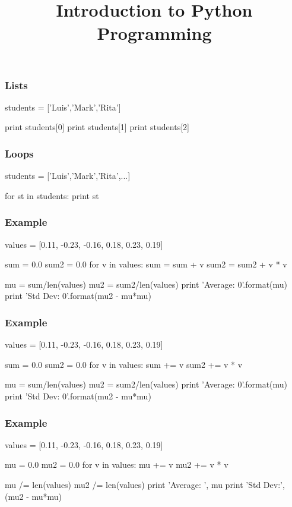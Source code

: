 
\title[Python I]{Introduction to Python Programming}


\frame{\maketitle}

\begin{frame}[fragile]
\frametitle{Lists}

\begin{python}

students = ['Luis','Mark','Rita']

print students[0]
print students[1]
print students[2]
\end{python}

\end{frame}

\begin{frame}[fragile]
\frametitle{Loops}

\begin{python}
students = ['Luis','Mark','Rita',...]

for st in students:
    print st
\end{python}
\end{frame}

\begin{frame}[fragile]
\frametitle{Example}

\begin{python}
values = [0.11, -0.23, -0.16, 0.18, 0.23, 0.19]

sum = 0.0
sum2 = 0.0
for v in values:
    sum = sum + v
    sum2 = sum2 + v * v

mu = sum/len(values)
mu2 = sum2/len(values)
print 'Average: {0}'.format(mu)
print 'Std Dev: {0}'.format(mu2 - mu*mu)
\end{python}
\end{frame}

\begin{frame}[fragile]
\frametitle{Example}

\begin{python}
values = [0.11, -0.23, -0.16, 0.18, 0.23, 0.19]

sum = 0.0
sum2 = 0.0
for v in values:
    sum += v
    sum2 += v * v

mu = sum/len(values)
mu2 = sum2/len(values)
print 'Average: {0}'.format(mu)
print 'Std Dev: {0}'.format(mu2 - mu*mu)
\end{python}
\end{frame}

\begin{frame}[fragile]
\frametitle{Example}

\begin{python}
values = [0.11, -0.23, -0.16, 0.18, 0.23, 0.19]

mu = 0.0
mu2 = 0.0
for v in values:
    mu += v
    mu2 += v * v

mu /= len(values)
mu2 /= len(values)
print 'Average: ', mu
print 'Std Dev:', (mu2 - mu*mu)
\end{python}
\end{frame}

